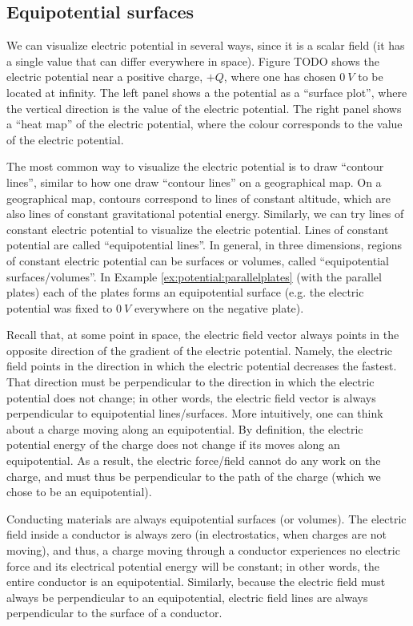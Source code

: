 \subsection{Equipotential surfaces}
We can visualize electric potential in several ways, since it is a scalar field (it has a single value that can differ everywhere in space). Figure TODO shows the electric potential near a positive charge, $+Q$, where one has chosen $\SI{0}{V}$ to be located at infinity. The left panel shows a the potential as a ``surface plot'', where the vertical direction is the value of the electric potential. The right panel shows a ``heat map'' of the electric potential, where the colour corresponds to the value of the electric potential.


The most common way to visualize the electric potential is to draw ``contour lines'', similar to how one draw ``contour lines'' on a geographical map. On a geographical map, contours correspond to lines of constant altitude, which are also lines of constant gravitational potential energy. Similarly, we can try lines of constant electric potential to visualize the electric potential. Lines of constant potential are called ``equipotential lines''. In general, in three dimensions, regions of constant electric potential can be surfaces or volumes, called ``equipotential surfaces/volumes''. In Example \ref{ex:potential:parallelplates} (with the parallel plates) each of the plates forms an equipotential surface (e.g. the electric potential was fixed to $\SI{0}{V}$ everywhere on the negative plate). 

Recall that, at some point in space, the electric field vector always points in the opposite direction of the gradient of the electric potential. Namely, the electric field points in the direction in which the electric potential decreases the fastest. That direction must be perpendicular to the direction in which the electric potential does not change; in other words, the electric field vector is always perpendicular to equipotential lines/surfaces. More intuitively, one can think about a charge moving along an equipotential. By definition, the electric potential energy of the charge does not change if its moves along an equipotential. As a result, the electric force/field cannot do any work on the charge, and must thus be perpendicular to the path of the charge (which we chose to be an equipotential).

Conducting materials are always equipotential surfaces (or volumes). The electric field inside a conductor is always zero (in electrostatics, when charges are not moving), and thus, a charge moving through a conductor experiences no electric force and its electrical potential energy will be constant; in other words, the entire conductor is an equipotential. Similarly, because the electric field must always be perpendicular to an equipotential, electric field lines are always perpendicular to the surface of a conductor.

